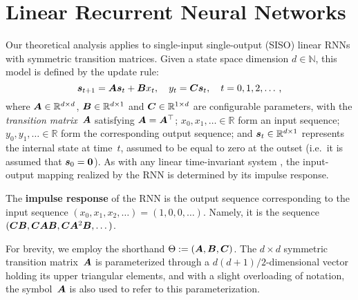 \section{Linear Recurrent Neural Networks \label{sec:setup}}

Our theoretical analysis applies to single-input single-output (SISO) linear RNNs with symmetric transition matrices.
Given a state space dimension $d \in \mathbb{N}$, this model is defined by the update rule:
\begin{equation}
    \label{eq:lin_rnn}
    {\bm{s}}_{t+1}={\bm{A}} {\bm{s}}_t+{\bm{B}} x_t,
    \quad
    y_t={\bm{C}} {\bm{s}}_t,
    \quad
    t = 0 , 1 , 2 , \ldots
    \text{\,,}
\end{equation}
where
${\bm{A}} \in\mathbb{R}^{d\times d}$, ${\bm{B}} \in \mathbb{R}^{d\times 1}$ and ${\bm{C}} \in \mathbb{R}^{1\times d}$ are configurable parameters, with the \emph{transition matrix}~${\bm{A}}$ satisfying ${\bm{A}} = {\bm{A}}^\top$;
$x_0 , x_1 , \ldots \in \mathbb{R}$ form an input sequence;
$y_0 , y_1 , \ldots \in \mathbb{R}$ form the corresponding output sequence; and 
${\bm{s}}_t\in\mathbb{R}^{d\times 1}$ represents the internal state at time~$t$, assumed to be equal to zero at the outset (i.e.~it is assumed that ${\bm{s}}_0=\mathbf{0}$).
As with any linear time-invariant system \citep{porat1996course}, the input-output mapping realized by the RNN is determined by its impulse response.
\begin{definition}\label{def:impulse_response}
The \textbf{impulse response} of the RNN is the output sequence corresponding to the input sequence $( x_0 , x_1 , x_2 , \ldots ) = ( 1,  0 , 0 , \ldots )$.
Namely, it is the sequence $({\bm{C}}{\bm{B}},{\bm{C}}{\bm{A}}{\bm{B}},{\bm{C}}{\bm{A}}^2{\bm{B}},\dots)$.
\end{definition}
For brevity, we employ the shorthand $\Theta := ({\bm{A}},{\bm{B}},{\bm{C}})$.
The $d \times d$ symmetric transition matrix~${\bm{A}}$ is parameterized through a $d ( d + 1 ) /2$-dimensional vector holding its upper triangular elements, and with a slight overloading of notation, the symbol~${\bm{A}}$ is also used to refer to this parameterization.

